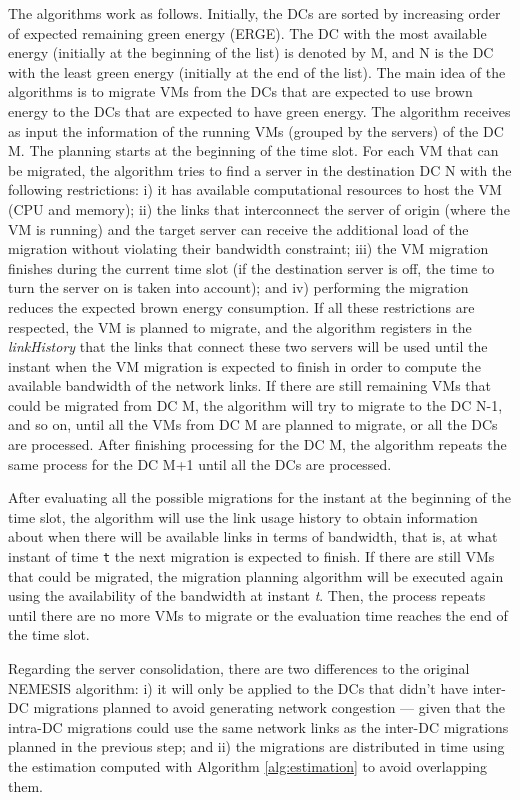 The algorithms work as follows. Initially, the DCs are sorted by increasing order of expected remaining green energy (ERGE). The DC with the most available energy (initially at the beginning of the list) is denoted by M, and N is the DC with the least green energy (initially at the end of the list). The main idea of the algorithms is to migrate VMs from the DCs that are expected to use brown energy to the DCs that are expected to have green energy. The algorithm receives as input the information of the running VMs (grouped by the servers) of the DC M. The planning starts at the beginning of the time slot. For each VM that can be migrated, the algorithm tries to find a server in the destination DC N with the following restrictions: i) it has available computational resources to host the VM (CPU and memory); ii) the links that interconnect the server of origin (where the VM is running) and the target server can receive the additional load of the migration without violating their bandwidth constraint; iii) the VM migration finishes during the current time slot (if the destination server is off, the time to turn the server on is taken into account); and iv) performing the migration reduces the expected brown energy consumption. If all these restrictions are respected, the VM is planned to migrate, and the algorithm registers in the \textit{linkHistory} that the links that connect these two servers will be used until the instant when the VM migration is expected to finish in order to compute the available bandwidth of the network links. If there are still remaining VMs that could be migrated from DC M, the algorithm will try to migrate to the DC N-1, and so on, until all the VMs from DC M are planned to migrate, or all the DCs are processed. After finishing processing for the DC M, the algorithm repeats the same process for the DC M+1 until all the DCs are processed. 

After evaluating all the possible migrations for the instant at the beginning of the time slot, the algorithm will use the link usage history to obtain information about when there will be available links in terms of bandwidth, that is, at what instant of time \texttt{t} the next migration is expected to finish.  If there are still VMs that could be migrated, the migration planning algorithm will be executed again using the availability of the bandwidth at instant \textit{t}. Then, the process repeats until there are no more VMs to migrate or the evaluation time reaches the end of the time slot.

Regarding the server consolidation, there are two differences to the original NEMESIS algorithm: i) it will only be applied to the DCs that didn't have inter-DC migrations planned to avoid generating network congestion --- given that the intra-DC migrations could use the same network links as the inter-DC migrations planned in the previous step; and ii) the migrations are distributed in time using the estimation computed with Algorithm \ref{alg:estimation} to avoid overlapping them.

